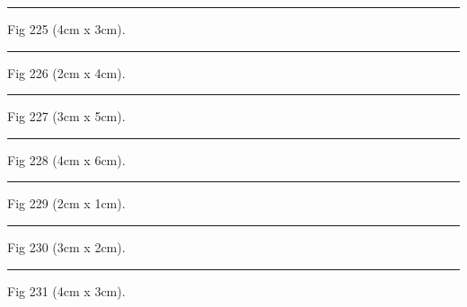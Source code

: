 \documentclass[a4paper,11pt]{article}
\begin{document}
\begin{swarmwrap}%
  \begin{minipage}[t]{4cm}
    \centering
    \rule{\linewidth}{3cm}
    {\footnotesize Fig 225 (4cm x 3cm).}
  \end{minipage}%
\end{swarmwrap}%
\swarmwrapnext
\lipsum[75]%

\begin{swarmwrap}%
  \begin{minipage}[t]{2cm}
    \centering
    \rule{\linewidth}{4cm}
    {\footnotesize Fig 226 (2cm x 4cm).}
  \end{minipage}%
\end{swarmwrap}%
\swarmwrapnext
\lipsum[76]%

\begin{swarmwrap}%
  \begin{minipage}[t]{3cm}
    \centering
    \rule{\linewidth}{5cm}
    {\footnotesize Fig 227 (3cm x 5cm).}
  \end{minipage}%
\end{swarmwrap}%
\swarmwrapnext
\lipsum[77]%

\begin{swarmwrap}%
  \begin{minipage}[t]{4cm}
    \centering
    \rule{\linewidth}{6cm}
    {\footnotesize Fig 228 (4cm x 6cm).}
  \end{minipage}%
\end{swarmwrap}%
\swarmwrapnext
\lipsum[78]%

\begin{swarmwrap}%
  \begin{minipage}[t]{2cm}
    \centering
    \rule{\linewidth}{1cm}
    {\footnotesize Fig 229 (2cm x 1cm).}
  \end{minipage}%
\end{swarmwrap}%
\swarmwrapnext
\lipsum[79]%

\begin{swarmwrap}%
  \begin{minipage}[t]{3cm}
    \centering
    \rule{\linewidth}{2cm}
    {\footnotesize Fig 230 (3cm x 2cm).}
  \end{minipage}%
\end{swarmwrap}%
\swarmwrapnext
\lipsum[80]%

\begin{swarmwrap}%
  \begin{minipage}[t]{4cm}
    \centering
    \rule{\linewidth}{3cm}
    {\footnotesize Fig 231 (4cm x 3cm).}
  \end{minipage}%
\end{swarmwrap}%
\swarmwrapnext
\lipsum[81]%
\end{document}
